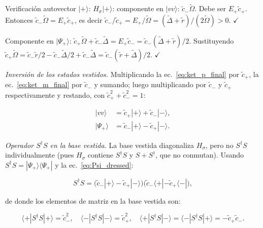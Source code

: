 \documentclass[12pt]{article}
\begin{document}
\noindent
Verificaci\'on autovector $|+\rangle$:
$H_\sigma|+\rangle$: componente en $|vv\rangle$: $\tilde{c}_-\widetilde\Omega$.
Debe ser $E_+\tilde{c}_+$. Entonces
$\tilde{c}_-\widetilde\Omega = E_+\tilde{c}_+$, es decir
$\tilde{c}_-/\tilde{c}_+ = E_+/\widetilde\Omega
= (\widetilde\Delta+\tilde{r})/(2\widetilde\Omega) > 0$. $\checkmark$

Componente en $|\Psi_+\rangle$:
$\tilde{c}_+\widetilde\Omega + \tilde{c}_-\widetilde\Delta
= E_+\tilde{c}_- = \tilde{c}_-(\widetilde\Delta+\tilde{r})/2$.
Sustituyendo $\tilde{c}_+\widetilde\Omega = \tilde{c}_-\tilde{r}/2 - \tilde{c}_-\widetilde\Delta/2 + \tilde{c}_-\widetilde\Delta = \tilde{c}_-(\tilde{r}+\widetilde\Delta)/2$. $\checkmark$


\textit{Inversión de los estados vestidos.}
Multiplicando la ec.~\eqref{eq:ket_p_final} por $\tilde{c}_+$,
la ec.~\eqref{eq:ket_m_final} por $\tilde{c}_-$ y sumando; luego
multiplicando por $\tilde{c}_-$ y $\tilde{c}_+$ respectivamente y
restando, con $\tilde{c}_+^2+\tilde{c}_-^2 = 1$:

\begin{align}
	|vv\rangle    &= \tilde{c}_+|{+}\rangle + \tilde{c}_-|{-}\rangle,
	\label{eq:vv_dressed}\\[4pt]
	|\Psi_+\rangle &= \tilde{c}_-|{+}\rangle - \tilde{c}_+|{-}\rangle.
	\label{eq:Psi_dressed}
\end{align}

\medskip
\noindent
\textit{Operador $S^\dagger S$ en la base vestida.}
La base vestida diagonaliza $H_\sigma$, pero no $S^\dagger S$
individualmente (pues $H_\sigma$ contiene $S^\dagger S$ y
$S+S^\dagger$, que no conmutan). Usando
$S^\dagger S = |\Psi_+\rangle\langle\Psi_+|$
y la ec.~\eqref{eq:Psi_dressed}:

\begin{equation}
	S^\dagger S
	= \bigl(\tilde{c}_-|{+}\rangle - \tilde{c}_+|{-}\rangle\bigr)
	\bigl(\tilde{c}_-\langle{+}| - \tilde{c}_+\langle{-}|\bigr),
\end{equation}

de donde los elementos de matriz en la base vestida son:

\begin{equation}
	\langle{+}|S^\dagger S|{+}\rangle = \tilde{c}_-^2, \quad
	\langle{-}|S^\dagger S|{-}\rangle = \tilde{c}_+^2, \quad
	\langle{+}|S^\dagger S|{-}\rangle = \langle{-}|S^\dagger S|{+}\rangle
	= -\tilde{c}_+\tilde{c}_-.
	\label{eq:SdagS_matrix}
\end{equation}
\end{document}
